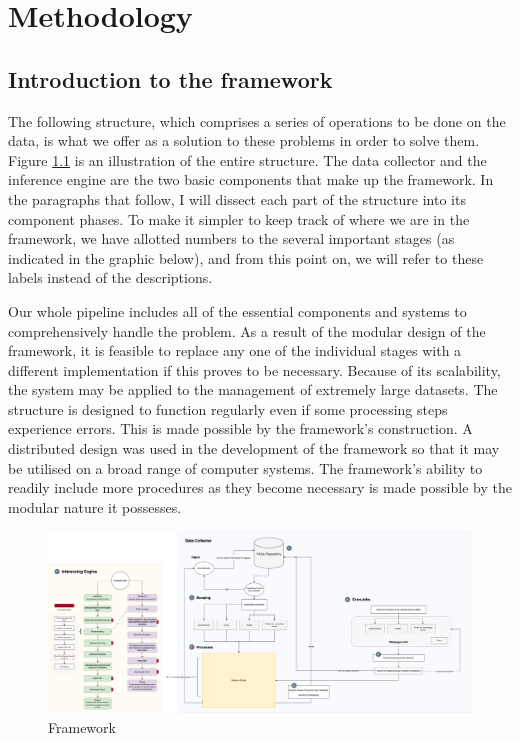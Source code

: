 \chapter{Methodology}

\section{Introduction to the framework} 
The following structure, which comprises a series of operations to be done on the data, is what we offer as a solution to these problems in order to solve them. Figure \ref{framework} is an illustration of the entire structure. The data collector and the inference engine are the two basic components that make up the framework. In the paragraphs that follow, I will dissect each part of the structure into its component phases. To make it simpler to keep track of where we are in the framework, we have allotted numbers to the several important stages (as indicated in the graphic below), and from this point on, we will refer to these labels instead of the descriptions.

Our whole pipeline includes all of the essential components and systems to comprehensively handle the problem. As a result of the modular design of the framework, it is feasible to replace any one of the individual stages with a different implementation if this proves to be necessary. Because of its scalability, the system may be applied to the management of extremely large datasets. The structure is designed to function regularly even if some processing steps experience errors. This is made possible by the framework's construction. A distributed design was used in the development of the framework so that it may be utilised on a broad range of computer systems. The framework's ability to readily include more procedures as they become necessary is made possible by the modular nature it possesses.

\newpage
\begin{landscape}
\begin{figure}[t]
  \noindent \includegraphics[scale=0.28, angle=0]{Framework.png}
\caption{Framework}\label{framework}
\end{figure}
\end{landscape}
\newpage

